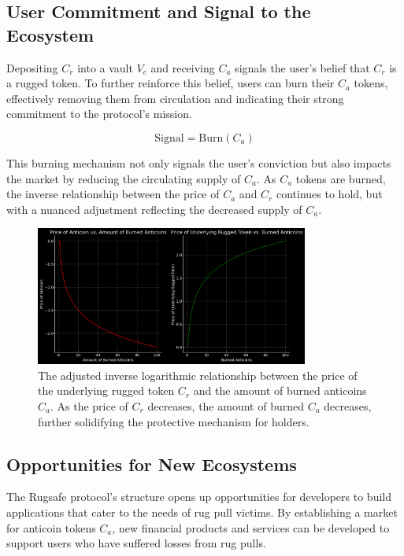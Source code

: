 \documentclass{article}
\begin{document}
\subsection{User Commitment and Signal to the Ecosystem}
Depositing $C_r$ into a vault $V_c$ and receiving $C_a$ signals the user's belief that $C_r$ is a rugged token. To further reinforce this belief, users can burn their $C_a$ tokens, effectively removing them from circulation and indicating their strong commitment to the protocol's mission.

\begin{equation}
\text{Signal} = \text{Burn}(C_a)
\end{equation}

This burning mechanism not only signals the user's conviction but also impacts the market by reducing the circulating supply of $C_a$. As $C_a$ tokens are burned, the inverse relationship between the price of $C_a$ and $C_r$ continues to hold, but with a nuanced adjustment reflecting the decreased supply of $C_a$.

\begin{figure}[h]
\centering
\includegraphics[width=0.8\textwidth]{images/4.png}
\caption{The adjusted inverse logarithmic relationship between the price of the underlying rugged token $C_r$ and the amount of burned anticoins $C_a$. As the price of $C_r$ decreases, the amount of burned $C_a$ decreases, further solidifying the protective mechanism for holders.}
\label{fig:burned_anticoins}
\end{figure}






\subsection{Opportunities for New Ecosystems}
The Rugsafe protocol's structure opens up opportunities for developers to build applications that cater to the needs of rug pull victims. By establishing a market for anticoin tokens $C_a$, new financial products and services can be developed to support users who have suffered losses from rug pulls. 
\end{document}
